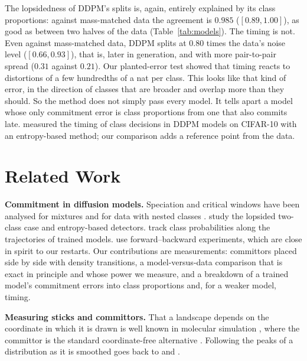 \documentclass[11pt]{article}
\newcommand{\para}[1]{\textbf{#1}\hspace{0.6em}}
\begin{document}
The lopsidedness of DDPM's splits is, again, entirely explained by its class proportions: against mass-matched data the agreement is $0.985$ ($[0.89,1.00]$), as good as between two halves of the data (Table~\ref{tab:models}). The timing is not. Even against mass-matched data, DDPM splits at $0.80$ times the data's noise level ($[0.66,0.93]$), that is, later in generation, and with more pair-to-pair spread ($0.31$ against $0.21$). Our planted-error test showed that timing reacts to distortions of a few hundredths of a nat per class. This looks like that kind of error, in the direction of classes that are broader and overlap more than they should. So the method does not simply pass every model. It tells apart a model whose only commitment error is class proportions from one that also commits late. \citet{handke2025measuring} measured the timing of class decisions in DDPM models on CIFAR-10 with an entropy-based method; our comparison adds a reference point from the data.

\section{Related Work}

\para{Commitment in diffusion models.}
Speciation and critical windows have been analysed for mixtures and for data with nested classes \citep{biroli2023generative,biroli2024dynamical,raya2023spontaneous,li2024critical,sclocchi2025phase,achilli2026theory,marta2026speciation}. \citet{stancevic2026information} study the lopsided two-class case and entropy-based detectors. \citet{handke2025measuring,handke2026entropic} track class probabilities along the trajectories of trained models. \citet{sclocchi2025phase} use forward--backward experiments, which are close in spirit to our restarts. Our contributions are measurements: committors placed side by side with density transitions, a model-versus-data comparison that is exact in principle and whose power we measure, and a breakdown of a trained model's commitment errors into class proportions and, for a weaker model, timing.

\para{Measuring sticks and committors.}
That a landscape depends on the coordinate in which it is drawn is well known in molecular simulation \citep{hartmann2007comment}, where the committor is the standard coordinate-free alternative \citep{e2010transition}. Following the peaks of a distribution as it is smoothed goes back to \citet{silverman1981using} and \citet{minnotte1993mode}.
\end{document}
